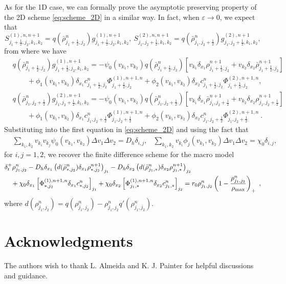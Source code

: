 \documentclass[review,onefignum,onetabnum]{siamart220329}
\begin{document}
As for the 1D case, we can formally prove the asymptotic preserving property of the 2D scheme \cref{eq:scheme_2D} in a similar way. 
In fact, when $\varepsilon\to 0$, we expect that  
\begin{equation*}
	S_{j_1+\frac12, j_2, k_1, k_2}^{(1), n, n+1} = q( {\bar{\rho}}_{j_1+\frac12,j_2}^n) g_{j_1+\frac12,j_2,k_1,k_2}^{(1), n+1}, \  S_{j_1, j_2+\frac12, k_1, k_2}^{(2), n, n+1} = q( {\bar{\rho}}_{j_1,j_2+\frac12}^n) g_{j_1,j_2+\frac12,k_1,k_2}^{(2), n+1},
\end{equation*}
from where we have
\begin{align*}
  & q( {\bar{\rho}}_{j_1+\frac12,j_2}^n) g_{j_1+\frac12,j_2,k_1,k_2}^{(1), n+1} = -\psi_{0}(v_{k_1}, v_{k_2})q( \bar{\rho}_{j_1+\frac12,j_2}^n)  \left[v_{k_1} \delta_{x_1} \rho_{j_1+\frac12, j_2}^{n+1} + v_{k_2} \delta_{x_2} \bar{\rho}_{j_1+\frac12, j_2}^{n+1} \right] \nonumber \\
        & \qquad  + \phi_{1}(v_{k_1}, v_{k_2})\delta_{x_1} c_{j_1+\frac12,j_2}^n \Phi^{(1),n+1,n}_{j_1+\frac12,j_2}+\phi_{2}(v_{k_1}, v_{k_2}) \delta_{x_2} c_{j_1+\frac12,j_2}^n
        \Phi^{(2),n+1,n}_{j_1+\frac12,j_2},\\
	&q( \bar{\rho}_{j_1,j_2+\frac12}^n) g_{j_1,j_2+\frac12,k_1,k_2}^{(2), n+1} = -\psi_{0}(v_{k_1}, v_{k_2})q( \bar{\rho}_{j_1,j_2+\frac12}^n)  \left[v_{k_1} \delta_{x_1} \bar{\rho}_{j_1, j_2+\frac12}^{n+1} + v_{k_2} \delta_{x_2} \rho_{j_1, j_2+\frac12}^{n+1} \right] \nonumber\\
    & \qquad  + \phi_{1}(v_{k_1}, v_{k_2})\delta_{x_1} c_{j_1,j_2+\frac12}^n\Phi^{(1),n+1,n}_{j_1,j_2+\frac12} +\phi_{2}(v_{k_1}, v_{k_2}) \delta_{x_2} c_{j_1,j_2+\frac12}^n 
    \Phi^{(2),n+1,n}_{j_1,j_2+\frac12}\ .
\end{align*}
Substituting into the first equation in \cref{eq:scheme_2D} and using the fact that
\begin{align*}
	&\sum_{k_1,k_2} v_{k_i}v_{k_j} \psi_0(v_{k_1},v_{k_2}) \Delta v_1 \Delta v_2 = D_h \delta_{i,j},  
	&\sum_{k_1,k_2} v_{k_i} \phi_j(v_{k_1},v_{k_2}) \Delta v_1 \Delta v_2 = \chi_0\delta_{i,j},                   
\end{align*}
for $i,j = 1,2$, 
we recover the finite difference scheme for the macro model 
\begin{align*}
	&\delta_t^+ \rho_{j_1,j_2}^n   
    	- D_h \delta_{x_1} \left( d(\bar{\rho}_{*,j_2}^n) \delta_{x_1} \rho_{*,j_2}^{n+1}\right)_{j_1} 
	- D_h \delta_{x_2} \left( d(\bar{\rho}_{j_1,*}^n)\delta_{x_2} \rho_{j_1, *}^{n+1} \right)_{j_2} 	\nonumber \\
	 & \quad + \chi_0\delta_{x_1}\left[\Phi_{*,j_2}^{(1),n+1,n}\delta_{x_1} c_{*,j_2}^n\right]_{j_1} 
	 + \chi_0\delta_{x_2}\left[\Phi_{j_1,*}^{(1),n+1,n}\delta_{x_2} c_{j_1,*}^n\right]_{j_2}
    = r_0 \rho_{j_1,j_2}^{n}\left(1 - \frac{\rho_{j_1,j_2}^n}{\rho_{\rm max}}\right)_+\ ,
\end{align*}
where $d(\rho_{j_1,j_2}^n) = q(\rho_{j_1,j_2}^n) - \rho_{j_1,j_2}^n q'( \rho_{j_1,j_2}^n)$.

\section*{Acknowledgments}
The authors wish to thank L. Almeida and K. J. Painter for helpful discussions and guidance.



\end{document}
